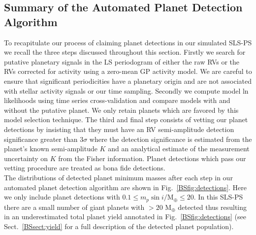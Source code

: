 \subsection{Summary of the Automated Planet Detection Algorithm}
To recapitulate our process of claiming planet detections in our simulated SLS-PS we
recall the three steps discussed throughout this section. Firstly we search for putative
planetary signals in the LS periodogram of either the raw RVs or the RVs corrected for activity using a
zero-mean GP activity model. We are careful to ensure that significant periodicities have a
planetary origin and are not associated with stellar activity signals or our time sampling. Secondly we
compute model ln likelihoods using time series cross-validation and compare models with and without the
putative planet. We only retain planets which are favored by this model selection technique. The third and
final step consists of vetting our planet detections by insisting that they must have an RV semi-amplitude
detection significance greater than $3\sigma$ where the detection significance is estimated from the
planet's known semi-amplitude $K$ and an analytical estimate of the measurement uncertainty on $K$ from
the Fisher information. Planet detections which pass our vetting procedure are treated as bona fide
detections. \\

The distributions of detected planet minimum masses after each step in our automated planet detection
algorithm are shown in Fig.~\ref{BSfig:detections}. Here we only include planet detections with
$0.1 \leq m_p\sin{i}/\text{M}_{\oplus} \leq 20$. In this SLS-PS there are a small number of giant planets
with \msini{} $> 20$ M$_{\oplus}$ detected thus resulting in an underestimated total planet yield annotated
in Fig.~\ref{BSfig:detections} (see Sect.~\ref{BSsect:yield} for a full description of the detected planet
population). \\

